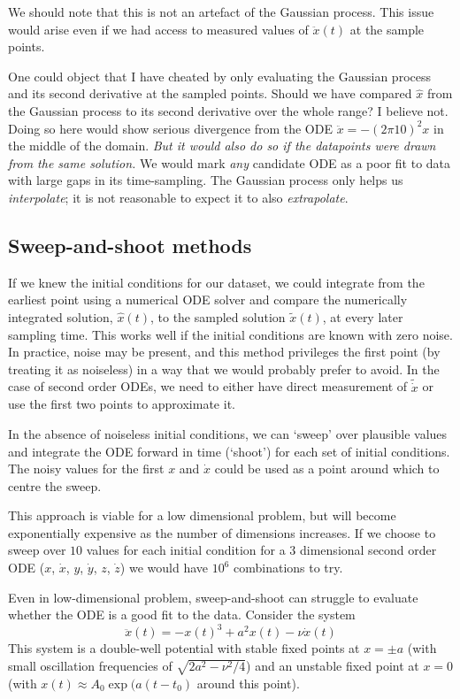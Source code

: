 \documentclass{article}
\begin{document}
We should note that this is not an artefact of the Gaussian process.
This issue would arise even if we had access to measured values of $\ddot{x}(t)$ at the sample points.

One could object that I have cheated by only evaluating the Gaussian process and its second derivative at the sampled points.
Should we have compared $\hat{x}$ from the Gaussian process to its second derivative over the whole range?
I believe not.
Doing so here would show serious divergence from the ODE $\ddot{x} = -(2\pi10)^2 x$ in the middle of the domain.
\emph{But it would also do so if the datapoints were drawn from the same solution.}
We would mark \emph{any} candidate ODE as a poor fit to data with large gaps in its time-sampling.
The Gaussian process only helps us \emph{interpolate}; it is not reasonable to expect it to also \emph{extrapolate}.

\subsection{Sweep-and-shoot methods}
\label{sec:sweep_and_shoot}

If we knew the initial conditions for our dataset, we could integrate from the earliest point using a numerical ODE solver and compare the numerically integrated solution, $\hat{x}(t)$, to the sampled solution $\tilde{x}(t)$, at every later sampling time.
This works well if the initial conditions are known with zero noise.
In practice, noise may be present, and this method privileges the first point (by treating it as noiseless) in a way that we would probably prefer to avoid.
In the case of second order ODEs, we need to either have direct measurement of $\tilde{\dot{x}}$ or use the first two points to approximate it.

In the absence of noiseless initial conditions, we can `sweep' over plausible values and integrate the ODE forward in time (`shoot') for each set of initial conditions.
The noisy values for the first $x$ and $\dot{x}$ could be used as a point around which to centre the sweep.

This approach is viable for a low dimensional problem, but will become exponentially expensive as the number of dimensions increases.
If we choose to sweep over $10$ values for each initial condition for a 3 dimensional second order ODE ($x$, $\dot{x}$, $y$, $\dot{y}$, $z$, $\dot{z}$) we would have $10^6$ combinations to try.

Even in low-dimensional problem, sweep-and-shoot can struggle to evaluate whether the ODE is a good fit to the data. Consider the system
$$
\ddot{x}(t) = - x(t)^3 + a^2 x(t) - \nu \dot{x}(t)
$$
This system is a double-well potential with stable fixed points at $x = \pm a$ (with small oscillation frequencies of $\sqrt{2 a^2 - \nu^2/4}$) and an unstable fixed point at $x=0$ (with $x(t) \approx A_0 \exp(a (t - t_0)$ around this point).
\end{document}
